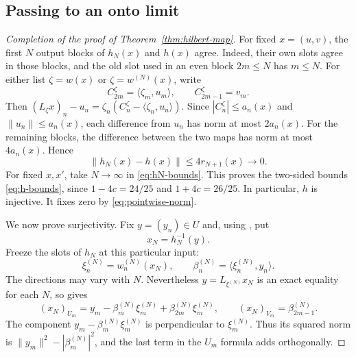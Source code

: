 \subsection{Passing to an onto limit}

\begin{proof}[Completion of the proof of Theorem~\ref{thm:hilbert-map}]
For fixed \(x=(u,v)\), the first \(N\) output blocks of \(h_N(x)\)
and \(h(x)\) agree. Indeed, their own slots agree in those blocks,
and the old slot used in an even block \(2m\le N\) has \(m\le N\).
For either list \(\zeta=w(x)\) or \(\zeta=w^{(N)}(x)\), write
\[
 C_{2m}^{\zeta}=\langle\zeta_m,u_m\rangle,\qquad
 C_{2m-1}^{\zeta}=v_m.
\]
Then
\((L_\zeta x)_n-u_n
 =\zeta_n(C_n^\zeta-\langle\zeta_n,u_n\rangle)\).
Since \(|C_n^\zeta|\le a_n(x)\) and \(\|u_n\|\le a_n(x)\),
each difference from \(u_n\) has norm at most \(2a_n(x)\).
For the remaining blocks, the difference between the two maps has
norm at most \(4a_n(x)\). Hence
\begin{equation}
\label{eq:h-pointwise-limit}
 \|h_N(x)-h(x)\|
 \le4r_{N+1}(x)\longrightarrow0.
\end{equation}
For fixed \(x,x'\), take \(N\to\infty\) in
\eqref{eq:hN-bounds}. This proves the two-sided bounds
\eqref{eq:h-bounds}, since \(1-4c=24/25\) and
\(1+4c=26/25\). In particular, \(h\) is injective. It fixes zero by
\eqref{eq:pointwise-norm}.

We now prove surjectivity. Fix \(y=(y_n)\in U\) and, using
, put
\[
 x_N=h_N^{-1}(y).
\]
Freeze the slots of \(h_N\) at this particular input:
\[
 \xi_n^{(N)}=w_n^{(N)}(x_N),\qquad
 \beta_n^{(N)}=\langle \xi_n^{(N)},y_n\rangle.
\]
The directions may vary with \(N\). Nevertheless
\(y=L_{\xi^{(N)}}x_N\) is an exact equality for each \(N\), so
 gives
\begin{equation}
\label{eq:xN-inverse}
 (x_N)_{U_m}
 =y_m-\beta_m^{(N)}\xi_m^{(N)}
       +\beta_{2m}^{(N)}\xi_m^{(N)},\qquad
 (x_N)_{V_m}=\beta_{2m-1}^{(N)}.
\end{equation}
The component \(y_m-\beta_m^{(N)}\xi_m^{(N)}\) is perpendicular
to \(\xi_m^{(N)}\). Thus its squared norm is
\(\|y_m\|^2-|\beta_m^{(N)}|^2\), and the last term in the
\(U_m\) formula adds orthogonally.


\end{proof}
